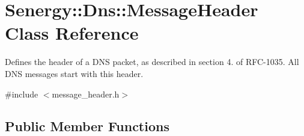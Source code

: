 \hypertarget{class_senergy_1_1_dns_1_1_message_header}{\section{Senergy\-:\-:Dns\-:\-:Message\-Header Class Reference}
\label{class_senergy_1_1_dns_1_1_message_header}
}


Defines the header of a D\-N\-S packet, as described in section 4. of R\-F\-C-\/1035. All D\-N\-S messages start with this header.  




{\ttfamily \#include $<$message\-\_\-header.\-h$>$}

\subsection*{Public Member Functions}
